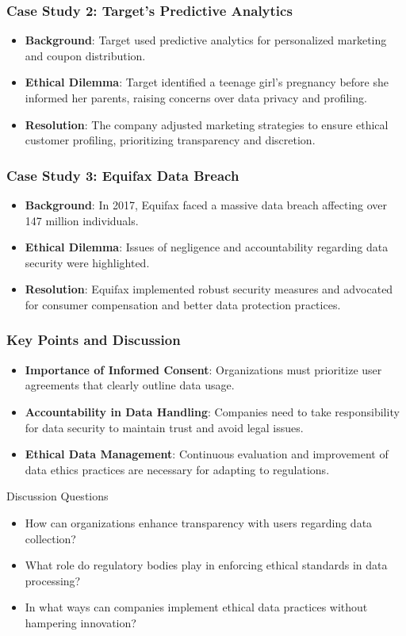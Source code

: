 \documentclass[aspectratio=169]{beamer}
\begin{document}
\begin{frame}[fragile]
    \frametitle{Case Study 2: Target's Predictive Analytics}
    \begin{itemize}
        \item \textbf{Background}: Target used predictive analytics for personalized marketing and coupon distribution.
        \item \textbf{Ethical Dilemma}: Target identified a teenage girl’s pregnancy before she informed her parents, raising concerns over data privacy and profiling.
        \item \textbf{Resolution}: The company adjusted marketing strategies to ensure ethical customer profiling, prioritizing transparency and discretion.
    \end{itemize}
\end{frame}

\begin{frame}[fragile]
    \frametitle{Case Study 3: Equifax Data Breach}
    \begin{itemize}
        \item \textbf{Background}: In 2017, Equifax faced a massive data breach affecting over 147 million individuals.
        \item \textbf{Ethical Dilemma}: Issues of negligence and accountability regarding data security were highlighted.
        \item \textbf{Resolution}: Equifax implemented robust security measures and advocated for consumer compensation and better data protection practices.
    \end{itemize}
\end{frame}

\begin{frame}[fragile]
    \frametitle{Key Points and Discussion}
    \begin{itemize}
        \item \textbf{Importance of Informed Consent}: Organizations must prioritize user agreements that clearly outline data usage.
        \item \textbf{Accountability in Data Handling}: Companies need to take responsibility for data security to maintain trust and avoid legal issues.
        \item \textbf{Ethical Data Management}: Continuous evaluation and improvement of data ethics practices are necessary for adapting to regulations.
    \end{itemize}
    \begin{block}{Discussion Questions}
        \begin{itemize}
            \item How can organizations enhance transparency with users regarding data collection?
            \item What role do regulatory bodies play in enforcing ethical standards in data processing?
            \item In what ways can companies implement ethical data practices without hampering innovation?
        \end{itemize}
    \end{block}
\end{frame}
\end{document}
